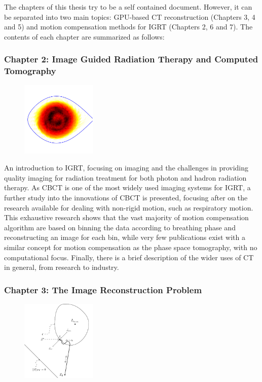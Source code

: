 The chapters of this thesis try to be a self contained document. However, it can be separated into two main topics: GPU-based CT reconstruction (Chapters 3, 4 and 5) and motion compensation methods for IGRT (Chapters 2, 6 and 7).  The contents of each chapter are summarized as follows:

\subsubsection{Chapter 2: Image Guided Radiation Therapy and Computed Tomography}


\begin{figure}
\centering
\includegraphics[width=0.32\textwidth]{StateOfArt/pst.png}
\end{figure}

An introduction to IGRT, focusing on imaging and the challenges in providing quality imaging for radiation treatment for both photon and hadron radiation therapy. As CBCT is one of the most widely used imaging systems for IGRT, a further study into the innovations of CBCT is presented, focusing after on the research available for dealing with non-rigid motion, such as respiratory motion. This exhaustive research shows that the vast majority of motion compensation algorithm are based on binning the data according to breathing phase and reconstructing an image for each bin, while very few publications exist with a similar concept for motion compensation as the phase space tomography, with no computational focus. Finally, there is a brief description of the wider uses of CT in general, from research to industry.

\vspace{40pt}
\subsubsection{Chapter 3: The Image Reconstruction Problem}

\begin{figure}
\centering
\includegraphics[width=0.32\textwidth]{RecAlgorithms/POCS.pdf}
\end{figure}

